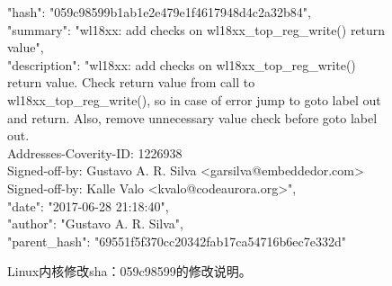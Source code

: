 \begin{figure}[t]
	\centering
	\begin{minipage}{0.75\linewidth}
{\footnotesize	
"hash": "059c98599b1ab1e2e479e1f4617948d4c2a32b84",\\
"summary": "wl18xx: add checks on wl18xx\_top\_reg\_write() return value",\\
"description": 
"wl18xx: add checks on wl18xx\_top\_reg\_write() return value.
Check return value from call to wl18xx\_top\_reg\_write(),
so in case of error jump to goto label out and return.
Also, remove unnecessary value check before goto label out.\\
Addresses-Coverity-ID: 1226938\\
Signed-off-by: Gustavo A. R. Silva <garsilva@embeddedor.com>\\
Signed-off-by: Kalle Valo <kvalo@codeaurora.org>",\\
"date": "2017-06-28 21:18:40",\\
"author": "Gustavo A. R. Silva",\\
"parent\_hash": "69551f5f370cc20342fab17ca54716b6ec7e332d"	
}
	\end{minipage}
	\caption{
	Linux内核修改sha：059c98599的修改说明。
	}
	\label{fig:2-3-description}
\end{figure}